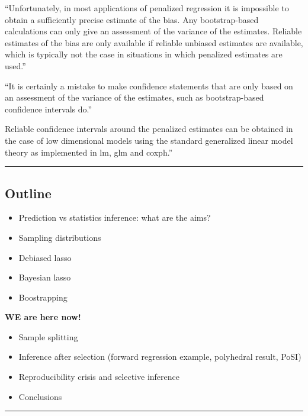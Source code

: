 \documentclass[
  letterpaper,
  DIV=11,
  numbers=noendperiod]{scrartcl}
\providecommand{\tightlist}{%
  \setlength{\itemsep}{0pt}\setlength{\parskip}{0pt}}\usepackage{longtable,booktabs,array}
\begin{document}
``Unfortunately, in most applications of penalized regression it is
impossible to obtain a suﬃciently precise estimate of the bias. Any
bootstrap-based calculations can only give an assessment of the variance
of the estimates. Reliable estimates of the bias are only available if
reliable unbiased estimates are available, which is typically not the
case in situations in which penalized estimates are used.''

``It is certainly a mistake to make conﬁdence statements that are only
based on an assessment of the variance of the estimates, such as
bootstrap-based conﬁdence intervals do.''

Reliable conﬁdence intervals around the penalized estimates can be
obtained in the case of low dimensional models using the standard
generalized linear model theory as implemented in lm, glm and coxph.''

\begin{center}\rule{0.5\linewidth}{0.5pt}\end{center}

\hypertarget{outline-1}{%
\subsection{Outline}\label{outline-1}}

\begin{itemize}
\tightlist
\item
  Prediction vs statistics inference: what are the aims?
\item
  Sampling distributions
\item
  Debiased lasso
\item
  Bayesian lasso
\item
  Boostrapping
\end{itemize}

\textbf{WE are here now!}

\begin{itemize}
\tightlist
\item
  Sample splitting
\item
  Inference after selection (forward regression example, polyhedral
  result, PoSI)
\item
  Reproducibility crisis and selective inference
\item
  Conclusions
\end{itemize}

\begin{center}\rule{0.5\linewidth}{0.5pt}\end{center}
\end{document}

